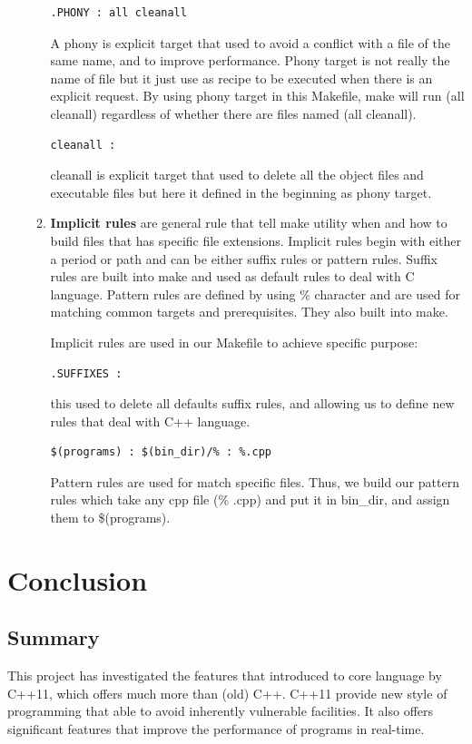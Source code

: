\documentclass[11pt]{report}
\begin{document}
\begin{enumerate}
\begin{enumerate}
\begin{verbatim}
.PHONY : all cleanall
\end{verbatim}
A phony is explicit target that used to avoid a conflict with a file of the same name, and to improve performance. Phony target is not really the name of file but it just use as recipe to be executed when there is an explicit request. By using phony target in this Makefile, make will run (all cleanall) regardless of whether there are files named (all cleanall).

\begin{verbatim}
cleanall :
\end{verbatim}
cleanall is explicit target that used to delete all the object files and executable files but here it defined in the beginning as phony target.

\item \textbf{Implicit rules} are general rule that tell make utility when and how to build files that has specific file extensions. Implicit rules begin with either a period or path and can be either suffix rules or pattern rules. Suffix rules are built into make and used as default rules to deal with C language.  Pattern rules are defined by using \% character and are used for matching common targets and prerequisites. They also built into make.

Implicit rules are used in our Makefile to achieve specific purpose:

\begin{verbatim}
.SUFFIXES :
\end{verbatim}

this used to delete all defaults suffix rules, and allowing us to define new rules that deal with C++ language.

\begin{verbatim}
$(programs) : $(bin_dir)/% : %.cpp
\end{verbatim}
Pattern rules are used for match specific files. Thus, we build our pattern rules which take any cpp file (\% .cpp) and put it in bin\_dir, and assign them to \$(programs). 

\end{enumerate}
\end{enumerate}


\chapter{Conclusion}
\label{sec: conclusion}

\section{Summary}
\label{se : summary}
This project has investigated the features that introduced to core language by C++11, which offers much more than (old) C++. C++11 provide new style of programming that able to avoid inherently vulnerable facilities. It also offers significant features that improve the performance of programs in real-time.
\end{document}
